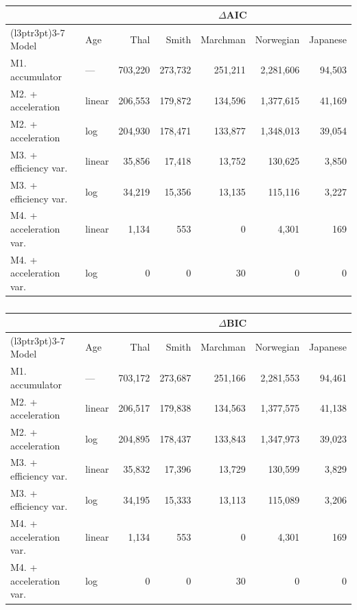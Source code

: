 \documentclass[
  11pt,
]{article}
\begin{document}
\begingroup\fontsize{8}{10}\selectfont

\begin{longtable}[t]{llrrrrr}

\caption{\label{tbl-aic}}

\tabularnewline

\toprule
\multicolumn{2}{c}{ } & \multicolumn{5}{c}{$\Delta$AIC} \\
\cmidrule(l{3pt}r{3pt}){3-7}
Model & Age & Thal & Smith & Marchman & Norwegian & Japanese\\
\midrule
M1. accumulator & — & 703,220 & 273,732 & 251,211 & 2,281,606 & 94,503\\
M2. + acceleration & linear & 206,553 & 179,872 & 134,596 & 1,377,615 & 41,169\\
M2. + acceleration & log & 204,930 & 178,471 & 133,877 & 1,348,013 & 39,054\\
M3. + efficiency var. & linear & 35,856 & 17,418 & 13,752 & 130,625 & 3,850\\
M3. + efficiency var. & log & 34,219 & 15,356 & 13,135 & 115,116 & 3,227\\
\addlinespace
M4. + acceleration var. & linear & 1,134 & 553 & 0 & 4,301 & 169\\
M4. + acceleration var. & log & 0 & 0 & 30 & 0 & 0\\
\bottomrule

\end{longtable}

\endgroup{}

\begingroup\fontsize{8}{10}\selectfont

\begin{longtable}[t]{llrrrrr}

\caption{\label{tbl-bic}}

\tabularnewline

\toprule
\multicolumn{2}{c}{ } & \multicolumn{5}{c}{$\Delta$BIC} \\
\cmidrule(l{3pt}r{3pt}){3-7}
Model & Age & Thal & Smith & Marchman & Norwegian & Japanese\\
\midrule
M1. accumulator & — & 703,172 & 273,687 & 251,166 & 2,281,553 & 94,461\\
M2. + acceleration & linear & 206,517 & 179,838 & 134,563 & 1,377,575 & 41,138\\
M2. + acceleration & log & 204,895 & 178,437 & 133,843 & 1,347,973 & 39,023\\
M3. + efficiency var. & linear & 35,832 & 17,396 & 13,729 & 130,599 & 3,829\\
M3. + efficiency var. & log & 34,195 & 15,333 & 13,113 & 115,089 & 3,206\\
\addlinespace
M4. + acceleration var. & linear & 1,134 & 553 & 0 & 4,301 & 169\\
M4. + acceleration var. & log & 0 & 0 & 30 & 0 & 0\\
\bottomrule

\end{longtable}
\end{document}

